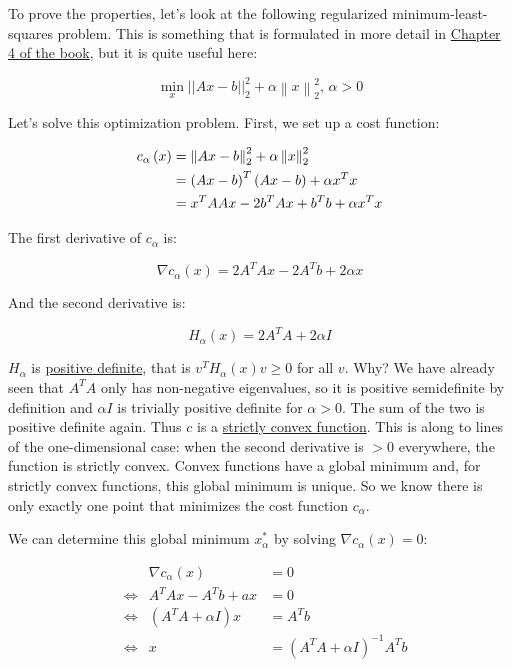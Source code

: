 \documentclass[]{scrartcl}
\begin{document}
To prove the properties, let's look at the following regularized
minimum-least-squares problem. This is something that is formulated in
more detail in
\href{http://www.deeplearningbook.org/contents/numerical.html\#pf11}{Chapter
4 of the book}, but it is quite useful here:

\[\min _{x}\left| \left| Ax-b\right| \right| _{2}^{2}+\alpha \left\| x\right\| _{2}^{2}, \, \alpha > 0\]

Let's solve this optimization problem. First, we set up a cost function:

\[ \begin{align*} 
c_\alpha\left( x\right) &=\left\| Ax-b\right\| _{2}^{2}+\alpha \left\| x\right\| _{2}^{2}\\
& =\left( Ax-b\right) ^{T}\left( Ax-b\right) +\alpha x^{T}x\\
& =x^{T}AAx-2b^{T}Ax+b^{T}b+\alpha x^{T} x \end{align*} \\
\]

The first derivative of \(c_\alpha\) is:

\[ \nabla c_\alpha\left( x\right) =2A^{T}Ax-2A^{T}b+2\alpha x\]

And the second derivative is:

\[ H_\alpha \left ( x \right ) = 2A^T A + 2\alpha I\]

\(H_\alpha\) is
\href{https://en.wikipedia.org/wiki/Positive-definite_matrix}{positive
definite}, that is \(v^T H_\alpha \left ( x \right ) v \ge 0\) for all
\(v\). Why? We have already seen that \(A^T A\) only has non-negative
eigenvalues, so it is positive semidefinite by definition and
\(\alpha I\) is trivially positive definite for \(\alpha > 0\). The sum
of the two is positive definite again. Thus \(c\) is a
\href{https://en.wikipedia.org/wiki/Convex_function}{strictly convex
function}. This is along to lines of the one-dimensional case: when the
second derivative is \(> 0\) everywhere, the function is strictly
convex. Convex functions have a global minimum and, for strictly convex
functions, this global minimum is unique. So we know there is only
exactly one point that minimizes the cost function \(c_\alpha\).

We can determine this global minimum \(x^*_\alpha\) by solving
\(\nabla c_\alpha \left ( x \right ) = 0\):

\[ \begin{align*} 
& & \nabla c_\alpha\left( x\right) &= 0 \\
& \Leftrightarrow & A^{T}Ax-A^{T}b+ax&=0\\
& \Leftrightarrow &\left( A^{T}A+\alpha I\right) x&=A^{T}b\\
& \Leftrightarrow & x&=\left( A^{T}A+\alpha I\right) ^{-1}A^{T}b\end{align*}
\]
\end{document}
